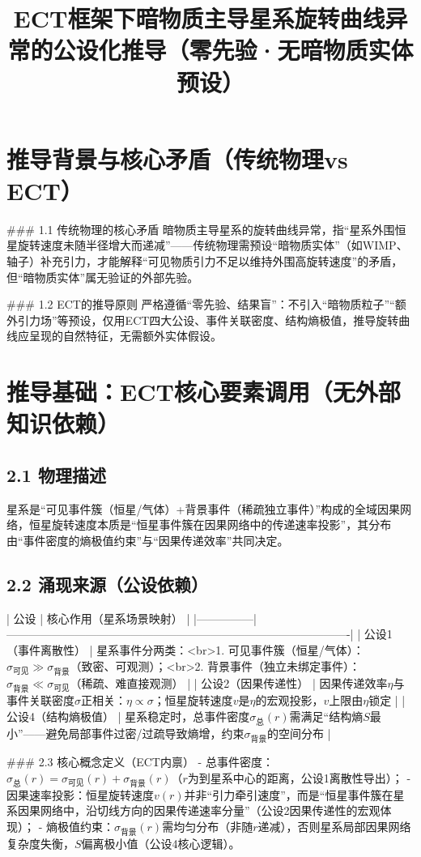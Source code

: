 \documentclass{article}
\title{ECT框架下暗物质主导星系旋转曲线异常的公设化推导（零先验·无暗物质实体预设）}
\author{}
\date{}
\begin{document}
\maketitle

\section{推导背景与核心矛盾（传统物理vs ECT）}
### 1.1 传统物理的核心矛盾
暗物质主导星系的旋转曲线异常，指“星系外围恒星旋转速度未随半径增大而递减”——传统物理需预设“暗物质实体”（如WIMP、轴子）补充引力，才能解释“可见物质引力不足以维持外围高旋转速度”的矛盾，但“暗物质实体”属无验证的外部先验。

### 1.2 ECT的推导原则
严格遵循“零先验、结果盲”：不引入“暗物质粒子”“额外引力场”等预设，仅用ECT四大公设、事件关联密度、结构熵极值，推导旋转曲线应呈现的自然特征，无需额外实体假设。


\section{推导基础：ECT核心要素调用（无外部知识依赖）}
\subsection{2.1 物理描述}
星系是“可见事件簇（恒星/气体）+背景事件（稀疏独立事件）”构成的全域因果网络，恒星旋转速度本质是“恒星事件簇在因果网络中的传递速率投影”，其分布由“事件密度的熵极值约束”与“因果传递效率”共同决定。

\subsection{2.2 涌现来源（公设依赖）}
| 公设          | 核心作用（星系场景映射）                                                                 |
|---------------|-------------------------------------------------------------------------------------------|
| 公设1（事件离散性） | 星系事件分两类：<br>1. 可见事件簇（恒星/气体）：\(\sigma_{\text{可见}} \gg \sigma_{\text{背景}}\)（致密、可观测）；<br>2. 背景事件（独立未绑定事件）：\(\sigma_{\text{背景}} \ll \sigma_{\text{可见}}\)（稀疏、难直接观测） |
| 公设2（因果传递性） | 因果传递效率\(\eta\)与事件关联密度\(\sigma\)正相关：\(\eta \propto \sigma\)；恒星旋转速度\(v\)是\(\eta\)的宏观投影，\(v\)上限由\(\eta\)锁定 |
| 公设4（结构熵极值） | 星系稳定时，总事件密度\(\sigma_{\text{总}}(r)\)需满足“结构熵\(S\)最小”——避免局部事件过密/过疏导致熵增，约束\(\sigma_{\text{背景}}\)的空间分布 |

### 2.3 核心概念定义（ECT内禀）
- 总事件密度：\(\sigma_{\text{总}}(r) = \sigma_{\text{可见}}(r) + \sigma_{\text{背景}}(r)\)（\(r\)为到星系中心的距离，公设1离散性导出）；
- 因果速率投影：恒星旋转速度\(v(r)\)并非“引力牵引速度”，而是“恒星事件簇在星系因果网络中，沿切线方向的因果传递速率分量”（公设2因果传递性的宏观体现）；
- 熵极值约束：\(\sigma_{\text{背景}}(r)\)需均匀分布（非随\(r\)递减），否则星系局部因果网络复杂度失衡，\(S\)偏离极小值（公设4核心逻辑）。
\end{document}
